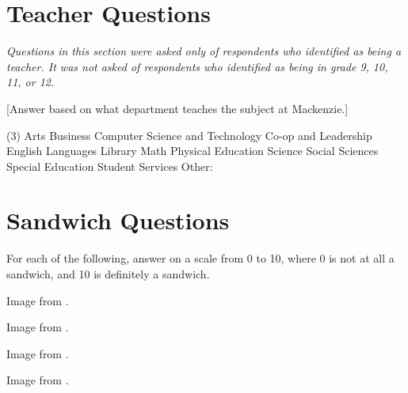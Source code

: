 \clearpage
\section{Teacher Questions}
	\textit{Questions in this section were asked only of respondents who identified as being a teacher.
	It was not asked of respondents who identified as being in grade 9, 10, 11, or 12.}

	\begin{minipage}{\textwidth}
		[Answer based on what department teaches the subject at Mackenzie.]
		\begin{multiplechoice}(3)
			\choice Arts
			\choice Business
			\choice Computer Science and Technology
			\choice Co-op and Leadership
			\choice English
			\choice Languages
			\choice Library
			\choice Math
			\choice Physical Education
			\choice Science
			\choice Social Sciences
			\choice Special Education
			\choice Student Services
			\choice Other: \blank
		\end{multiplechoice}
	\end{minipage}

\clearpage
\section{Sandwich Questions}
	For each of the following, answer on a scale from 0 to 10, where 0 is not at all a sandwich, and 10 is definitely a sandwich.

	\begin{minipage}{\textwidth}
		Image from \cite{hamSandwich}.
	\end{minipage}

	\begin{minipage}{\textwidth}
		Image from \cite{bltSandwich}.
	\end{minipage}

	\begin{minipage}{\textwidth}
		Image from \cite{grilledCheese}.
	\end{minipage}

	\begin{minipage}{\textwidth}
		Image from \cite{panini}.
	\end{minipage}

